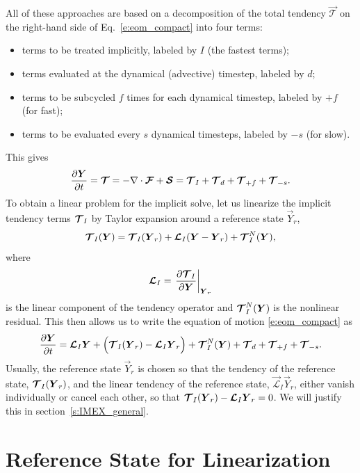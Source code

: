 \documentclass{report}
\begin{document}
All of these approaches are based on a decomposition of the total tendency $\vec{\mathcal{T}}$ on the right-hand side of Eq.~\eqref{e:eom_compact} into four terms: 
\begin{itemize}
    \item terms to be treated implicitly, labeled by $I$ (the fastest terms);
    \item terms evaluated at the dynamical (advective) timestep, labeled by $d$;
    \item terms to be subcycled $f$ times for each dynamical timestep, labeled by $+f$ (for fast);
    \item terms to be evaluated every $s$ dynamical timesteps, labeled by $-s$ (for slow).
\end{itemize}
This gives
\[
\frac{\partial \boldsymbol{{Y}}}{\partial t} = \boldsymbol{{\mathcal{T}}} = - \nabla \cdot \boldsymbol{{\mathcal{F}}} + \boldsymbol{{\mathcal{S}}} = \boldsymbol{{\mathcal{T}}}_{I} + \boldsymbol{{\mathcal{T}}}_{d} + \boldsymbol{{\mathcal{T}}}_{+f} + \boldsymbol{{\mathcal{T}}}_{-s}.
\]
To obtain a linear problem for the implicit solve, let us linearize the implicit tendency terms $\boldsymbol{{\mathcal{T}}}_{I}$ by Taylor expansion around a reference state $\vec{Y}_r$,
\begin{equation}\label{e:imex_linearization}
\boldsymbol{{\mathcal{T}}}_{I}(\boldsymbol{{Y}}) =  \boldsymbol{{\mathcal{T}}}_I(\boldsymbol{{Y}}_r) + \boldsymbol{{\mathcal{L}}}_I (\boldsymbol{{Y}} - \boldsymbol{{Y}}_r) + \boldsymbol{{\mathcal{T}}}^N_{I}(\boldsymbol{{Y}}),
\end{equation}
where 
\begin{equation}
    \boldsymbol{{\mathcal{L}}}_I = \left. \frac{\partial\boldsymbol{{\mathcal{T}}}_I}{\partial\boldsymbol{{Y}}}\right|_{\boldsymbol{{Y}}_r}
\end{equation} 
is the linear component of the tendency operator and $\boldsymbol{{\mathcal{T}}}^N_{I}(\boldsymbol{{Y}})$ is the nonlinear residual. This then allows us to write the equation of motion \eqref{e:eom_compact} as
\begin{equation}
\label{eq:IMEX}
\frac{\partial\boldsymbol{{Y}}}{\partial t} =  \boldsymbol{{\mathcal{L}}}_I \boldsymbol{{Y}} + \Bigl(\boldsymbol{{\mathcal{T}}}_I(\boldsymbol{{Y}}_r) - \boldsymbol{{\mathcal{L}}}_I \boldsymbol{{Y}}_r\Bigr) + \boldsymbol{{\mathcal{T}}}^N_{I}(\boldsymbol{{Y}}) + \boldsymbol{{\mathcal{T}}}_{d} + \boldsymbol{{\mathcal{T}}}_{+f} + \boldsymbol{{\mathcal{T}}}_{-s}.
\end{equation}
Usually, the reference state $\vec{Y}_r$ is chosen so that the tendency of the reference state, $\boldsymbol{{\mathcal{T}}}_I(\boldsymbol{{Y}}_r)$, and the linear tendency of the reference state, $\vec{\mathcal{L}}_I \vec{Y}_r$, either vanish individually or cancel each other, so that $\boldsymbol{{\mathcal{T}}}_I(\boldsymbol{{Y}}_r) - \boldsymbol{{\mathcal{L}}}_I \boldsymbol{{Y}}_r=0$. We will justify this in section~\ref{s:IMEX_general}.

\section{Reference State for Linearization}
\end{document}
